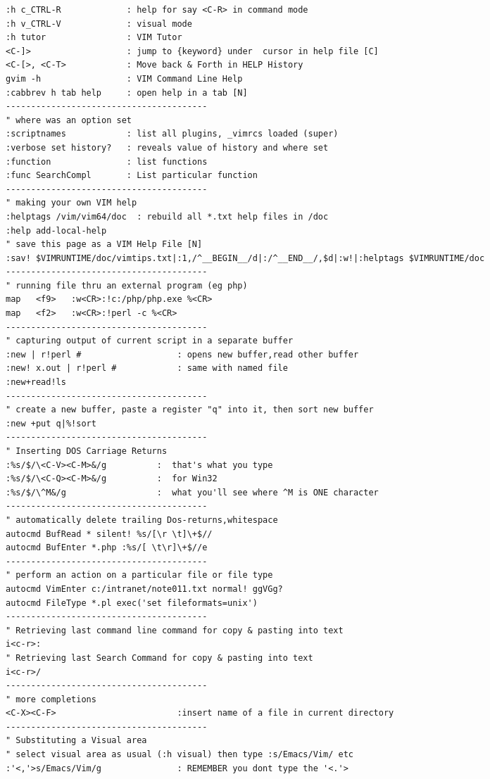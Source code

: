 \documentclass[10pt,landscape]{article}
\begin{document}
\begin{multicols}{2}
\begin{verbatim}
:h c_CTRL-R             : help for say <C-R> in command mode
:h v_CTRL-V             : visual mode
:h tutor                : VIM Tutor
<C-]>                   : jump to {keyword} under  cursor in help file [C]
<C-[>, <C-T>            : Move back & Forth in HELP History
gvim -h                 : VIM Command Line Help
:cabbrev h tab help     : open help in a tab [N]
----------------------------------------
" where was an option set
:scriptnames            : list all plugins, _vimrcs loaded (super)
:verbose set history?   : reveals value of history and where set
:function               : list functions
:func SearchCompl       : List particular function
----------------------------------------
" making your own VIM help
:helptags /vim/vim64/doc  : rebuild all *.txt help files in /doc
:help add-local-help
" save this page as a VIM Help File [N]
:sav! $VIMRUNTIME/doc/vimtips.txt|:1,/^__BEGIN__/d|:/^__END__/,$d|:w!|:helptags $VIMRUNTIME/doc
----------------------------------------
" running file thru an external program (eg php)
map   <f9>   :w<CR>:!c:/php/php.exe %<CR>
map   <f2>   :w<CR>:!perl -c %<CR>
----------------------------------------
" capturing output of current script in a separate buffer
:new | r!perl #                   : opens new buffer,read other buffer
:new! x.out | r!perl #            : same with named file
:new+read!ls
----------------------------------------
" create a new buffer, paste a register "q" into it, then sort new buffer
:new +put q|%!sort
----------------------------------------
" Inserting DOS Carriage Returns
:%s/$/\<C-V><C-M>&/g          :  that's what you type
:%s/$/\<C-Q><C-M>&/g          :  for Win32
:%s/$/\^M&/g                  :  what you'll see where ^M is ONE character
----------------------------------------
" automatically delete trailing Dos-returns,whitespace
autocmd BufRead * silent! %s/[\r \t]\+$//
autocmd BufEnter *.php :%s/[ \t\r]\+$//e
----------------------------------------
" perform an action on a particular file or file type
autocmd VimEnter c:/intranet/note011.txt normal! ggVGg?
autocmd FileType *.pl exec('set fileformats=unix')
----------------------------------------
" Retrieving last command line command for copy & pasting into text
i<c-r>:
" Retrieving last Search Command for copy & pasting into text
i<c-r>/
----------------------------------------
" more completions
<C-X><C-F>                        :insert name of a file in current directory
----------------------------------------
" Substituting a Visual area
" select visual area as usual (:h visual) then type :s/Emacs/Vim/ etc
:'<,'>s/Emacs/Vim/g               : REMEMBER you dont type the '<.'>

\end{verbatim}
\end{multicols}
\end{document}
